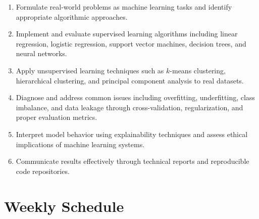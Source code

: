 \documentclass[
    language=english,
    doctype=curriculum,
    institution=none,
]{../../omnilatex}
\begin{document}
\begin{enumerate}
    \item Formulate real-world problems as machine learning tasks and identify appropriate algorithmic approaches.
    \item Implement and evaluate supervised learning algorithms including linear regression, logistic regression, support vector machines, decision trees, and neural networks.
    \item Apply unsupervised learning techniques such as $k$-means clustering, hierarchical clustering, and principal component analysis to real datasets.
    \item Diagnose and address common issues including overfitting, underfitting, class imbalance, and data leakage through cross-validation, regularization, and proper evaluation metrics.
    \item Interpret model behavior using explainability techniques and assess ethical implications of machine learning systems.
    \item Communicate results effectively through technical reports and reproducible code repositories.
\end{enumerate}

\section{Weekly Schedule}
\end{document}
